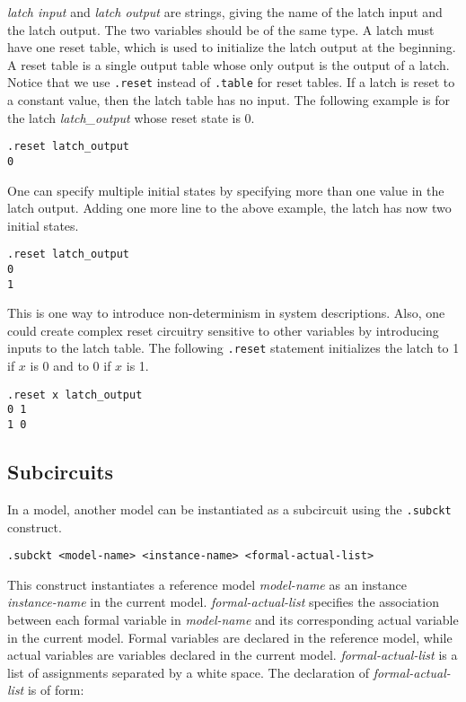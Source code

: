 {\em latch input} and {\em latch output} are strings,
giving the name of the latch input and the latch output.
The two variables should be of the same type.
A latch must have one reset table,
which is used to initialize the latch output
at the beginning.
A reset table is a single output table whose only output is
the output of a latch.
Notice that we use {\tt .reset} instead of {\tt .table}
for reset tables.
If a latch is reset to a constant value,
then the latch table has no input.
The following example is for the latch {\em latch\_output}
whose reset state is 0.

\begin{verbatim}
.reset latch_output
0
\end{verbatim}

One can specify multiple initial states
by specifying more than one value in the latch output.
Adding one more line to the above example,
the latch has now two initial states.

\begin{verbatim}
.reset latch_output
0
1
\end{verbatim}

This is one way to introduce non-determinism in system descriptions.
Also, one could create complex reset circuitry sensitive to
other variables by introducing inputs to the latch table.
The following {\tt .reset} statement
initializes the latch to 1 if $x$ is 0 and to 0 if $x$ is 1.

\begin{verbatim}
.reset x latch_output
0 1
1 0
\end{verbatim}

\subsection{Subcircuits}
In a model,
another model can be instantiated as a subcircuit
using the {\tt .subckt} construct.

\begin{verbatim}
.subckt <model-name> <instance-name> <formal-actual-list>
\end{verbatim}

This construct instantiates a reference model {\em model-name}
as an instance {\em instance-name} in the current model.
{\em formal-actual-list} specifies
the association between each formal variable in
{\em model-name}
and its corresponding actual variable in the current model.
Formal variables are declared in the reference model,
while
actual variables are variables
declared in the current model.
{\em formal-actual-list} is
a list of assignments separated by a white space.
The declaration of {\em formal-actual-list}
is of form:

